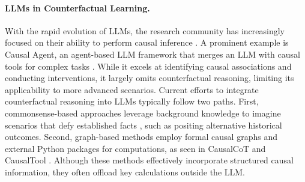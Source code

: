 \paragraph{LLMs in Counterfactual Learning.}
With the rapid evolution of LLMs, the research community has increasingly focused on their ability to perform causal inference \cite{zhang2023understanding,ashwani2024cause}. A prominent example is Causal Agent, an agent-based LLM framework that merges an LLM with causal tools for complex tasks \cite{han2024causal}. While it excels at identifying causal associations and conducting interventions, it largely omits counterfactual reasoning, limiting its applicability to more advanced scenarios. Current efforts to integrate counterfactual reasoning into LLMs typically follow two paths. First, commonsense-based approaches leverage background knowledge to imagine scenarios that defy established facts \cite{ning2024skeleton,chatzi2024counterfactual,musi2024fallacy,vicuna2023}, such as positing alternative historical outcomes. Second, graph-based methods employ formal causal graphs and external Python packages for computations, as seen in CausalCoT \cite{jin2023cladder} and CausalTool \cite{hua2024improving}. Although these methods effectively incorporate structured causal information, they often offload key calculations outside the LLM. %








